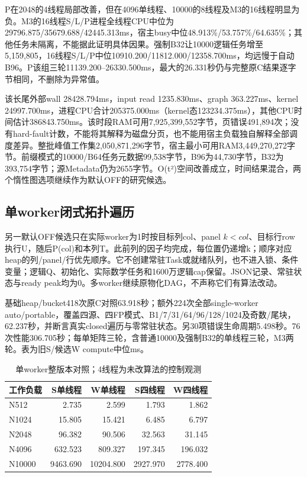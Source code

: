 \documentclass[UTF8,a4paper,11pt]{ctexart}
\begin{document}
P在2048的4线程局部改善，但在4096单线程、10000的8线程及M3的16线程明显为负。M3的16线程S/L/P进程全线程CPU中位为29796.875/35679.688/42445.313ms，宿主busy中位48.913\%/53.757\%/64.635\%；其他任务未隔离，不能据此证明具体因果。强制B32让10000逻辑任务增至5,159,805，16线程S/L/P中位10910.200/11812.000/12358.700ms，均远慢于自动B96。P该组三轮11139.200--26330.500ms，最大的26.331秒仍与完整原C结果逐字节相同，不删除为异常值。

该长尾外部wall 28428.794ms，input read 1235.830ms、graph 363.227ms、kernel 24997.700ms，进程CPU合计205375.000ms（kernel态123234.375ms），其他CPU时间估计386843.750ms。该时段RAM可用7,925,399,552字节，页错误491,894次；没有hard-fault计数，不能将其解释为磁盘分页，也不能用宿主负载独自解释全部调度差异。整批峰值工作集2,050,871,296字节，宿主最小可用RAM3,449,270,272字节。前缀模式的10000/B64任务元数据99,538字节，B96为44,730字节，B32为393,754字节；源Metadata仍为2655字节。O(t²)空间改善成立，时间结果混合，两个惰性图选项继续作为默认OFF的研究候选。

\subsection{单worker闭式拓扑遍历}
另一默认OFF候选只在实际worker为1时按目标列col、panel $k<col$、目标行row执行U，随后P(col)和本列T。此前列的因子均完成，每位置仍递增k；顺序对应heap的列/panel/行优先顺序。它不创建常驻Task或就绪队列，也不进入锁、条件变量；逻辑Q、初始化、实际数学任务和1600万逻辑cap保留。JSON记录、常驻状态与ready peak均为0。多worker继续原物化DAG，不声称它们有算法改动。

基础heap/bucket418次原C对照63.918秒；额外224次全部single-worker auto/portable，覆盖四源、四FP模式、B1/7/31/64/96/128/1024及奇数/尾块，62.237秒，并断言真实closed遍历与零常驻状态。另30项错误生命周期5.498秒。76次性能306.705秒；每单矩阵三轮，含普通10000及强制B32的单线程三轮，M3两轮。表为旧S/候选W compute中位ms。
\begin{table}[htbp]\centering\small
\caption{单worker整版本对照；4线程为未改算法的控制观测}
\begin{tabular}{lrrrr}\toprule
工作负载&S单线程&W单线程&S四线程&W四线程\\\midrule
N512&2.735&2.599&1.793&1.862\\
N1024&15.805&15.421&6.485&6.797\\
N2048&96.382&90.506&32.563&31.145\\
N4096&632.523&809.327&197.345&196.032\\
N10000&9463.690&10204.800&2927.970&2778.400\\
\bottomrule\end{tabular}\end{table}
\end{document}
